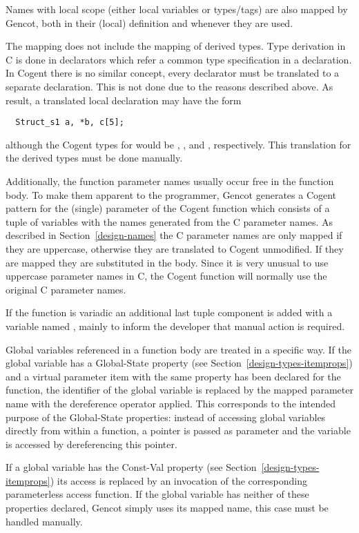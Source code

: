 Names with local scope (either local variables or types/tags) are also mapped by Gencot, both in their (local)
definition and whenever they are used. 

The mapping does not include the mapping of derived types. Type derivation in C is done in declarators which refer
a common type specification in a declaration. In Cogent there is no similar concept, every declarator must be 
translated to a separate declaration. This is not done due to the reasons described above. As result, a translated
local declaration may have the form
\begin{verbatim}
  Struct_s1 a, *b, c[5];
\end{verbatim}
although the Cogent types for  would be , , and 
, respectively. This translation for the derived types must be done manually.

Additionally, the function parameter names usually occur free in the function body. To make them apparent to
the programmer, Gencot generates a Cogent pattern for the (single) parameter of the Cogent function which 
consists of a tuple of variables with the names generated from the C parameter names. As described in 
Section~\ref{design-names} the C parameter names are only mapped if they are uppercase, otherwise they are
translated to Cogent unmodified. If they are mapped they are substituted in the body. Since it is very unusual
to use uppercase parameter names in C, the Cogent function will normally use the original C parameter names.

If the function is variadic an additional last tuple component is added with a variable named
, mainly to inform the developer that manual action is required.

Global variables referenced in a function body are treated in a specific way. If the global variable has a 
Global-State property (see Section~\ref{design-types-itemprops}) and a virtual parameter item with the same
property has been declared for the function, the identifier of the global variable is replaced by the 
mapped parameter name with the dereference operator applied. This corresponds to the intended purpose of the 
Global-State properties: instead of accessing global variables directly from within a function, a pointer is 
passed as parameter and the variable is accessed by dereferencing this pointer.

If a global variable has the Const-Val property (see Section~\ref{design-types-itemprops}) its access is
replaced by an invocation of the corresponding parameterless access function. If the global variable has 
neither of these properties declared, Gencot simply uses its mapped name, this case must be handled manually.

